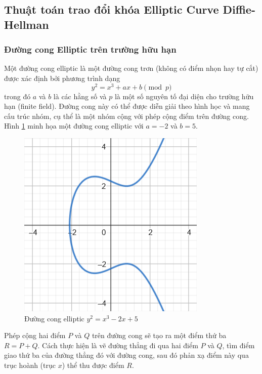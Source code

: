 \subsection{Thuật toán trao đổi khóa Elliptic Curve Diffie-Hellman}
\subsubsection{Đường cong Elliptic trên trường hữu hạn}
Một đường cong elliptic là một đường cong trơn (không có điểm nhọn hay tự cắt) được xác định bởi phương trình dạng
\[
    y^2 = x^3 + ax + b \pmod{p}
\]
trong đó $a$ và $b$ là các hằng số và $p$ là một số nguyên tố đại diện cho trường hữu hạn (finite field). Đường cong này có thể được diễn giải theo hình học và mang cấu trúc nhóm, cụ thể là một nhóm cộng với phép cộng điểm trên đường cong. Hình \ref{fig:curve} minh họa một đường cong elliptic với $a = -2$ và $b = 5$.

\begin{figure}[h]
    \centering
    \includegraphics[width=0.4\linewidth]{curve.png}
    \caption{Đường cong elliptic $y^2 = x^3 - 2x + 5$}
    \label{fig:curve}
\end{figure}

Phép cộng hai điểm $P$ và $Q$ trên đường cong sẽ tạo ra một điểm thứ ba $R = P + Q$. Cách thực hiện là vẽ đường thẳng đi qua hai điểm $P$ và $Q$, tìm điểm giao thứ ba của đường thẳng đó với đường cong, sau đó phản xạ điểm này qua trục hoành (trục $x$) thể thu được điểm $R$.
